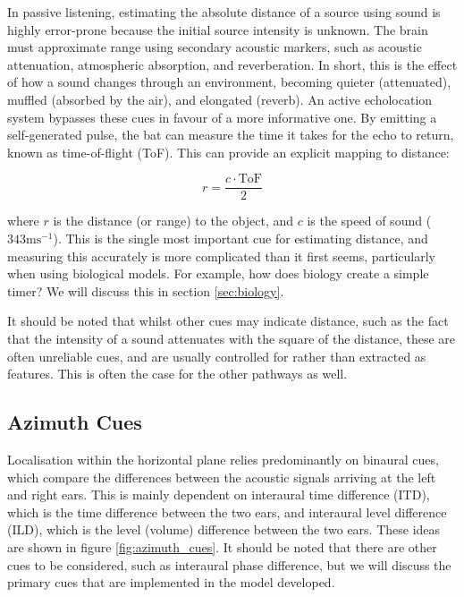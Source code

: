 In passive listening, estimating the absolute distance of a source using sound is highly error-prone because the initial source intensity is unknown. The brain must approximate range using
secondary acoustic markers, such as acoustic attenuation, atmospheric absorption, and reverberation. In short, this is the effect of how a sound changes through an environment, becoming quieter (attenuated), muffled (absorbed by the air), and elongated (reverb). An active echolocation system bypasses these cues in favour of a more informative one. By emitting
a self-generated pulse, the bat can measure the time it takes for the echo to return, known as time-of-flight (ToF). This can provide an explicit mapping to distance:

\begin{equation}
    r= \frac{c \cdot \text{ToF}}{2}
    \label{eq:tof_distance}
\end{equation}

where $r$ is the distance (or range) to the object, and $c$ is the speed of sound ($343 \text{m}\text{s}^{-1}$). This is the single most important cue for estimating distance, and measuring this accurately is more complicated than it first seems, particularly when using biological models. For example, how does biology create a simple timer? We will discuss this in section \ref{sec:biology}.

It should be noted that whilst other cues may indicate distance, such as the fact that the intensity of a sound attenuates with the square of the distance, these are often unreliable cues, and are usually controlled for rather than extracted as features. This is often the case for the other pathways as well.



\subsection{Azimuth Cues}
Localisation within the horizontal plane relies predominantly on binaural cues, which compare the differences between the acoustic signals arriving at the left and right ears. This is mainly dependent on interaural time difference (ITD), which is the time difference between the two ears, and interaural level difference (ILD), which is the level (volume) difference between the two ears. These ideas are shown in figure \ref{fig:azimuth_cues}. It should be noted that there are other cues to be considered, such as interaural phase difference, but we will discuss the primary cues that are implemented in the model developed.



